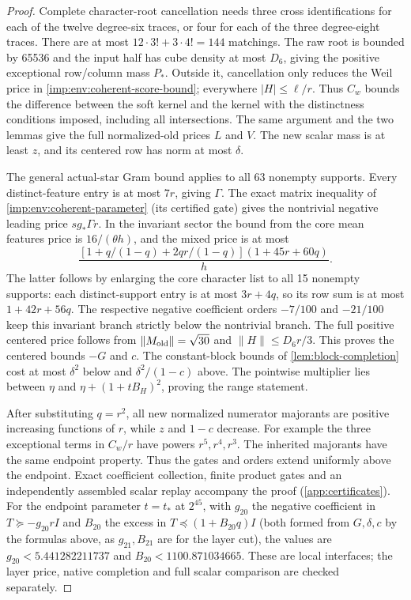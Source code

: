\begin{proof}
Complete character-root cancellation needs three cross identifications
for each of the twelve degree-six traces, or four for each of the
three degree-eight traces.  There are at most
$12\cdot3!+3\cdot4!=144$ matchings.  The raw root is bounded by 65536
and the input half has cube density at most $D_6$, giving the positive
exceptional row/column mass $P_*$.  Outside it, cancellation only
reduces the Weil price in \eqref{imp:env:coherent-score-bound}; everywhere
$|H|\le\ell/r$.  Thus $C_w$ bounds the difference between the soft kernel and
the kernel with the distinctness conditions imposed, including all intersections.  The same argument and the two lemmas give the full
normalized-old prices $L$ and $V$.  The new scalar mass is at least $z$,
and its centered row has norm at most $\delta$.

The general actual-star Gram bound applies to all 63 nonempty supports.
Every distinct-feature entry is at most $7r$, giving $\Gamma$.
The exact matrix inequality of
\cref{imp:env:coherent-parameter} (its certified gate) gives
the nontrivial negative leading price $s g_*\Gamma r$. In the
invariant sector the bound from the core mean features
price is $16/(\theta h)$, and the mixed price is at most
\[
 \frac{[1+q/(1-q)+2qr/(1-q)](1+45r+60q)}h.
\]
The latter follows by enlarging the core character list to all 15
nonempty supports: each distinct-support entry is at most $3r+4q$,
so its row sum is at most $1+42r+56q$.  The respective negative
coefficient orders $-7/100$ and $-21/100$ keep this invariant branch
strictly below the nontrivial branch.  The full positive centered
price follows from $\|M_{\rm old}\|=\sqrt{30}$ and
$\|H\|\le D_6r/3$.  This proves the centered bounds $-G$ and $c$.
The constant-block bounds of \cref{lem:block-completion} cost at most
$\delta^2$ below and $\delta^2/(1-c)$ above.  The pointwise multiplier lies between
$\eta$ and $\eta+(1+tB_H)^2$, proving the range statement.

After substituting $q=r^2$, all new normalized numerator majorants
are positive increasing functions of $r$, while $z$ and $1-c$ decrease.
For example the three exceptional terms in $C_w/r$ have powers
$r^5,r^4,r^3$.  The inherited majorants have the same endpoint
property.  Thus the gates and orders extend uniformly above the
endpoint.  Exact coefficient collection, finite product gates and
an independently assembled scalar replay accompany the proof (\cref{app:certificates}).
For the endpoint parameter $t=t_*$ at $2^{45}$, with $g_{20}$
the negative coefficient in $T\succeq-g_{20}rI$ and $B_{20}$ the
excess in $T\preceq(1+B_{20}q)I$ (both formed from $G,\delta,c$
by the formulas above, as $g_{21},B_{21}$ are for the layer cut),
the values are $g_{20}<5.441282211737$ and
$B_{20}<1100.871034665$.
These are local interfaces; the layer price, native completion and
full scalar comparison are checked separately.
\end{proof}


